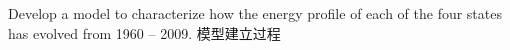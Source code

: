  Develop a model to characterize how the energy profile of each of the four states has evolved from 1960 – 2009. 
模型建立过程
